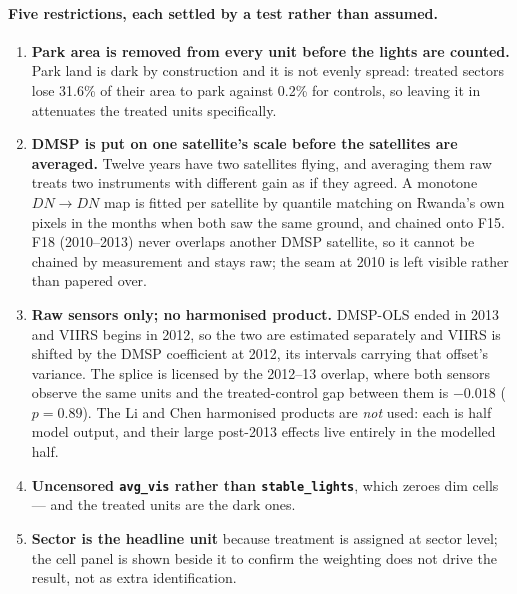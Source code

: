 \documentclass[11pt]{article}
\begin{document}
\paragraph{Five restrictions, each settled by a test rather than assumed.}
\begin{enumerate}\itemsep2pt
\item \textbf{Park area is removed from every unit before the lights are counted.} Park land is dark
by construction and it is not evenly spread: treated sectors lose 31.6\% of their area to park
against 0.2\% for controls, so leaving it in attenuates the treated units specifically.
\item \textbf{DMSP is put on one satellite's scale before the satellites are averaged.} Twelve years
have two satellites flying, and averaging them raw treats two instruments with different gain as if
they agreed. A monotone $DN\rightarrow DN$ map is fitted per satellite by quantile matching on
Rwanda's own pixels in the months when both saw the same ground, and chained onto F15. F18
(2010--2013) never overlaps another DMSP satellite, so it cannot be chained by measurement and stays
raw; the seam at 2010 is left visible rather than papered over.
\item \textbf{Raw sensors only; no harmonised product.} DMSP-OLS ended in 2013 and VIIRS begins in
2012, so the two are estimated separately and VIIRS is shifted by the DMSP coefficient at 2012, its
intervals carrying that offset's variance. The splice is licensed by the 2012--13 overlap, where both
sensors observe the same units and the treated-control gap between them is $-0.018$ ($p=0.89$). The
Li and Chen harmonised products are \emph{not} used: each is half model output, and their large
post-2013 effects live entirely in the modelled half.
\item \textbf{Uncensored \texttt{avg\_vis} rather than \texttt{stable\_lights}}, which zeroes dim
cells --- and the treated units are the dark ones.
\item \textbf{Sector is the headline unit} because treatment is assigned at sector level; the cell
panel is shown beside it to confirm the weighting does not drive the result, not as extra
identification.
\end{enumerate}
\end{document}
